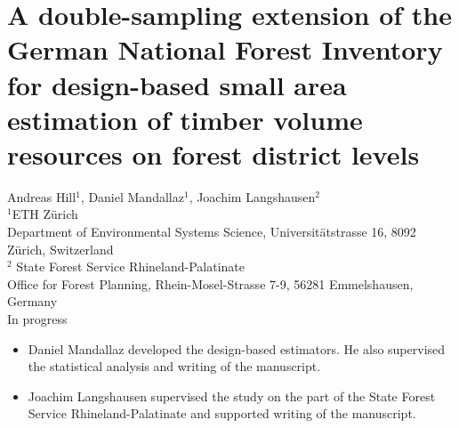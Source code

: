 \chapter{A double-sampling extension of the German National Forest Inventory for design-based small area estimation of timber volume resources on forest district levels}
\label{chap:sae}

{\large Andreas Hill$^1$, Daniel Mandallaz$^1$, Joachim Langshausen$^2$}\\

\vspace{3cm}
\noindent
$^1$ETH Z\"urich\\Department of Environmental Systems Science, Universit\"atstrasse 16, 8092 Z\"urich, Switzerland \\
$^2$ State Forest Service Rhineland-Palatinate\\Office for Forest Planning, Rhein-Mosel-Strasse 7-9, 56281 Emmelshausen, Germany \\


\vspace{\fill}
\noindent
In progress

\newpage
\thispagestyle{plain}
\renewcommand{\labelitemi}{--}
\begin{itemize}
	\item Daniel Mandallaz developed the design-based estimators. He also supervised the statistical analysis and writing of the manuscript.
	\item Joachim Langshausen supervised the study on the part of the State Forest Service Rhineland-Palatinate and supported writing of the manuscript.
\end{itemize}

\clearpage
